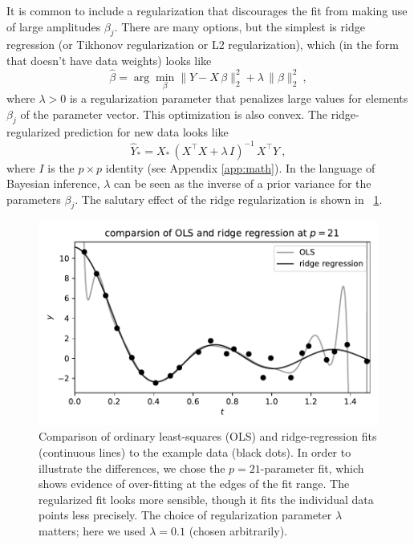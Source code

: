 \documentclass[12pt,letterpaper]{article}
\newlength{\figurewidth}
\begin{document}
It is common to include a regularization that discourages the fit from making use of large amplitudes $\beta_j$.
There are many options, but the simplest is ridge regression (or Tikhonov regularization or L2 regularization), which (in the form that doesn't have data weights) looks like
\begin{equation} \label{eq:ridge}
    \hat{\beta} = \arg\min_\beta \|Y - X\,\beta\|_2^2 + \lambda\,\|\beta\|_2^2
    ~,
\end{equation}
where $\lambda>0$ is a regularization parameter that penalizes large values for elements $\beta_j$ of the parameter vector.
This optimization is also convex.
The ridge-regularized prediction for new data looks like
\begin{equation} \label{eq:ridge_sol}
    \hat{Y}_\ast = X_\ast\,(X^\top X + \lambda\,I)^{-1}\,X^\top Y
    ~,
\end{equation}
where $I$ is the $p\times p$ identity (see Appendix \ref{app:math}).
In the language of Bayesian inference, $\lambda$ can be seen as the inverse of a prior variance for the parameters $\beta_j$.
The salutary effect of the ridge regularization is shown in \figurename~\ref{fig:ridge}.
\begin{figure}[t]
    \begin{mdframed}
    \includegraphics[width=\figurewidth]{paper/ridge.pdf}
    \caption{Comparison of ordinary least-squares (OLS) and ridge-regression fits (continuous lines) to the example data (black dots). In order to illustrate the differences, we chose the $p=21$-parameter fit, which shows evidence of over-fitting at the edges of the fit range. The regularized fit looks more sensible, though it fits the individual data points less precisely. The choice of regularization parameter $\lambda$ matters; here we used $\lambda=0.1$ (chosen arbitrarily).}
    \label{fig:ridge}
    \end{mdframed}
\end{figure}
\end{document}
